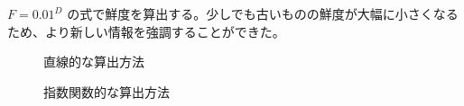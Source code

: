 $ F =  0.01 ^ D$ の式で鮮度を算出する。少しでも古いものの鮮度が大幅に小さくなるため、より新しい情報を強調することができた。

\begin{figure}[htbp]
  \begin{minipage}{0.5\hsize}
    \begin{center}
    \end{center}
    \caption{直線的な算出方法}
  \end{minipage}
  \begin{minipage}{0.5\hsize}
    \begin{center}
    \end{center}
    \caption{指数関数的な算出方法}
  \end{minipage}
\end{figure}
